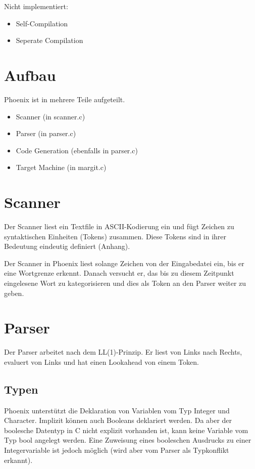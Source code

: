 \documentclass[a4paper]{article}
\begin{document}
	Nicht implementiert:
	\begin{itemize}
		\item Self-Compilation
		\item Seperate Compilation
	\end{itemize}

	\section{Aufbau}
	Phoenix ist in mehrere Teile aufgeteilt.
	\begin{itemize}
		\item Scanner (in scanner.c)
		\item Parser (in parser.c)
		\item Code Generation (ebenfalls in parser.c)
		\item Target Machine (in margit.c)
	\end{itemize}


	\section{Scanner}
	Der Scanner liest ein Textfile in ASCII-Kodierung ein und fügt Zeichen zu syntaktischen Einheiten (Tokens) zusammen.
	Diese Tokens sind in ihrer Bedeutung eindeutig definiert (Anhang).

	Der Scanner in Phoenix liest solange Zeichen von der Eingabedatei ein, bis er eine Wortgrenze erkennt.
	Danach versucht er, das bis zu diesem Zeitpunkt eingelesene Wort zu kategorisieren und dies als Token an den Parser weiter zu geben.

	\section{Parser}
	Der Parser arbeitet nach dem LL(1)-Prinzip. Er liest von Links nach Rechts, evaluert von Links und hat einen Lookahead von einem Token.

	\subsection{Typen}

	Phoenix unterstützt die Deklaration von Variablen vom Typ Integer und Character.
	Implizit können auch Booleans deklariert werden.
	Da aber der boolesche Datentyp in C nicht explizit vorhanden ist, kann keine Variable vom Typ bool angelegt werden.
	Eine Zuweisung eines booleschen Ausdrucks zu einer Integervariable ist jedoch möglich (wird aber vom Parser als Typkonflikt erkannt).
\end{document}
